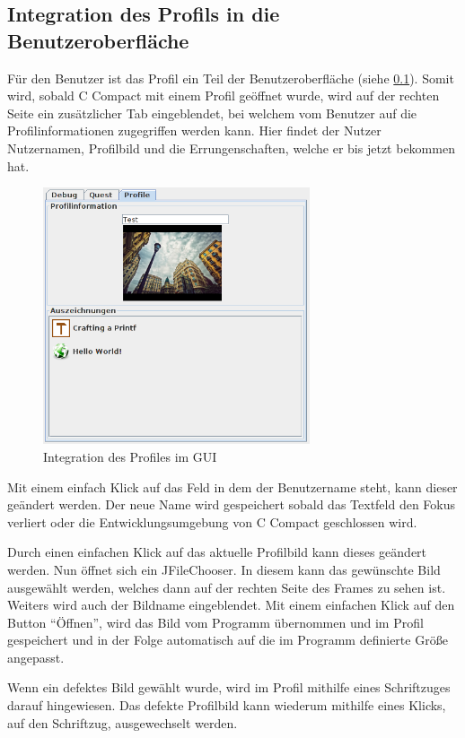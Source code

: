 \subsection{Integration des Profils in die Benutzeroberfläche}
Für den Benutzer ist das Profil ein Teil der Benutzeroberfläche (siehe \ref{}). Somit wird, sobald C Compact mit einem Profil geöffnet wurde, wird auf der rechten Seite ein zusätzlicher Tab eingeblendet, bei welchem vom Benutzer auf die Profilinformationen zugegriffen werden kann. Hier findet der Nutzer Nutzernamen, Profilbild und die Errungenschaften, welche er bis jetzt bekommen hat.

\begin{figure}[h] 
  \centering
     \includegraphics[width=0.7\textwidth]{./media/images/gui/profile.png}
  \caption{Integration des Profiles im GUI}
  \label{fig:profile_gui}
\end{figure}


Mit einem einfach Klick auf das Feld in dem der Benutzername steht, kann dieser geändert werden. Der neue Name wird gespeichert sobald das Textfeld den Fokus verliert oder die Entwicklungsumgebung von C Compact geschlossen wird.

Durch einen einfachen Klick auf das aktuelle Profilbild kann dieses geändert werden. Nun öffnet sich ein JFileChooser. In diesem kann das gewünschte Bild ausgewählt werden, welches dann auf der rechten Seite des Frames zu sehen ist. Weiters wird auch der Bildname eingeblendet. Mit einem einfachen Klick auf den Button "`Öffnen"', wird das Bild vom Programm übernommen und im Profil gespeichert und in der Folge automatisch auf die im Programm definierte Größe angepasst.

Wenn ein defektes Bild gewählt wurde, wird im Profil mithilfe eines Schriftzuges darauf hingewiesen. Das defekte Profilbild kann wiederum mithilfe eines Klicks, auf den Schriftzug, ausgewechselt werden.

